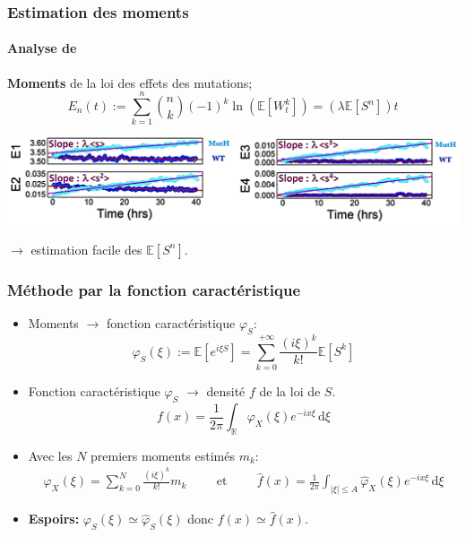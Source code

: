 \documentclass{beamer}
\newcommand{\pth}[1]{\left(#1\right)}
\newcommand{\cro}[1]{\left[#1\right]}
\newcommand{\abs}[1]{\left|#1\right|}
\newcommand{\et}{\hspace{1cm}\text{et}\hspace{1cm}}
\newcommand{\de}{\,\text{d}}
\newcommand{\Esp}[1]{\mathbb{E}\cro{#1}}
\begin{document}
\begin{frame}
  \frametitle{Estimation des moments}

  \framesubtitle{Analyse de \cite{rob}}

  
\textbf{Moments} de la loi des effets des mutations;
 \[E_n(t):=\sum_{k=1}^n\binom{n}{k}(-1)^k\ln\pth{\Esp{W_t^k}}=\pth{\lambda\Esp{S^n}}t\]
 \pause
    \vspace{0.7cm}
 \begin{centering}
 
    \includegraphics[scale=0.55]{img/Moments_estimation.png}
 \end{centering}
    \vspace{0.7cm}
 
$\to$ estimation facile des $\Esp{S^n}$.
\end{frame}


\begin{frame}
  \frametitle{Méthode par la fonction caractéristique}
  
  \begin{itemize}[label=$\bullet$]
  \item Moments $\to$ fonction caractéristique $\varphi_S$: 
    \[\varphi_S(\xi):=\Esp{e^{i\xi S}}=\sum_{k=0}^{+\infty}\frac{(i\xi)^k}{k!}\Esp{S^k}\]
    \pause
  \item Fonction caractéristique $\varphi_S$ $\to$ densité $f$ de la loi de $S$.
    \[f(x) = \frac1{2\pi} \int_{\mathbb R}\varphi_X(\xi)e^{-ix\xi}\de\xi\]
    \pause
  \item Avec les $N$ premiers moments estimés $m_k$:
    \begin{align*}
      \hat{\varphi}_X(\xi)=\sum_{k=0}^{N}\frac{(i\xi)^k}{k!}m_k
      \et\hat{f}(x)= \frac1{2\pi} \int_{\abs{\xi}\leqslant A}\hat\varphi_X(\xi)e^{-ix\xi}\de\xi
    \end{align*}
    \pause
    \vspace{0.3cm}
    
  \item  \textbf{Espoirs:} $\varphi_S(\xi)\simeq \hat{\varphi}_S(\xi)$ donc $f(x)\simeq\hat{f}(x)$.
  \end{itemize}
  
\end{frame}
\end{document}
